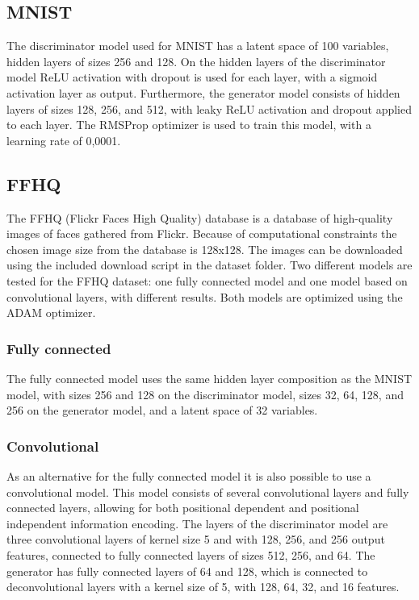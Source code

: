 \subsection{MNIST}\label{subsec:mnist}
The discriminator model used for MNIST has a latent space of 100 variables, hidden layers of
sizes 256 and 128.
On the hidden layers of the discriminator model ReLU activation with dropout is used for each
layer, with a sigmoid activation layer as output.
Furthermore, the generator model consists of hidden layers of sizes 128, 256, and 512, with leaky
ReLU activation and dropout applied to each layer.
The RMSProp optimizer is used to train this model, with a learning rate of 0,0001.

\subsection{FFHQ}\label{subsec:ffhq}
The FFHQ (Flickr Faces High Quality) database is a database of high-quality images of faces
gathered from Flickr.
Because of computational constraints the chosen image size from the database is 128x128.
The images can be downloaded using the included download script in the dataset folder.
Two different models are tested for the FFHQ dataset: one fully connected model and one model 
based on convolutional layers, with different results.
Both models are optimized using the ADAM optimizer.

\subsubsection{Fully connected}
The fully connected model uses the same hidden layer composition as the MNIST model, with sizes
256 and 128 on the discriminator model, sizes 32, 64, 128, and 256 on the generator model, and a
latent space of 32 variables.

\subsubsection{Convolutional}
As an alternative for the fully connected model it is also possible to use a convolutional model.
This model consists of several convolutional layers and fully connected layers, allowing for both
positional dependent and positional independent information encoding.
The layers of the discriminator model are three convolutional layers of kernel size 5 and with
128, 256, and 256 output features, connected to fully connected layers of sizes 512, 256, and 64.
The generator has fully connected layers of 64 and 128, which is connected to deconvolutional
layers with a kernel size of 5, with 128, 64, 32, and 16 features.

